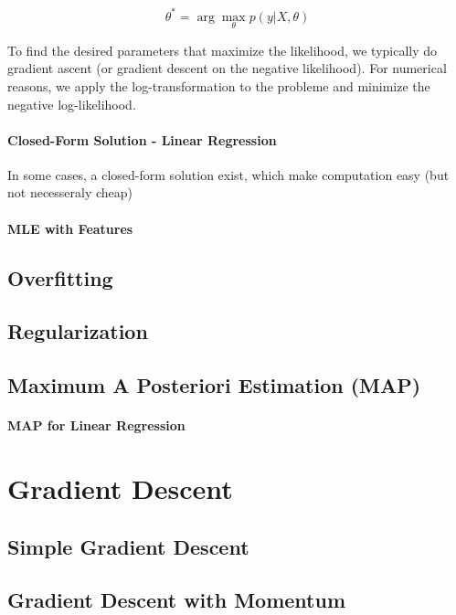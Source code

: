 	\[
		\theta^* = \arg \max_{\theta} p(y | X, \theta)
	\]

	To find the desired parameters that maximize the likelihood, we typically do gradient ascent (or gradient descent on the negative likelihood). For numerical reasons, we apply the log-transformation to the probleme and minimize the negative log-likelihood. 

		\paragraph*{Closed-Form Solution - Linear Regression}

			In some cases, a closed-form solution exist, which make computation easy (but not necesseraly cheap)

		\paragraph*{MLE with Features}

	\subsection{Overfitting}

	\subsection{Regularization}
	\subsection{Maximum A Posteriori Estimation (MAP)}

		\paragraph*{MAP for Linear Regression}

\section{Gradient Descent}

	\subsection{Simple Gradient Descent}

	\subsection{Gradient Descent with Momentum}

